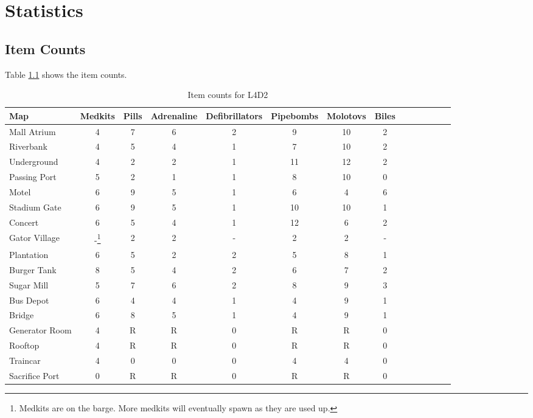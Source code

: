 \appendix
\chapter{Statistics}
\section{Item Counts}
Table \ref{tab:item_counts2} shows the item counts.

\begin{savenotes}
\begin{table}[htb!]
\centering
\caption{Item counts for L4D2}
\label{tab:item_counts2}
\resizebox{\columnwidth}{!} {
\begin{tabular}{|l|c|c|c|c|c|c|c|c|c|c|c|c|c|}
\hline
Map & Medkits & Pills & Adrenaline & Defibrillators & Pipebombs & Molotovs & Biles \\ \hline
Mall Atrium & 4 & 7 & 6&  2 & 9 & 10 & 2 \\ \hline
Riverbank & 4 & 5 & 4&  1 & 7 & 10 & 2 \\ \hline
Underground & 4 & 2 & 2&  1 & 11 & 12 & 2 \\ \hline
Passing Port & 5 & 2 & 1&  1 & 8 & 10 & 0 \\ \hline
Motel & 6 & 9 & 5&  1 & 6 & 4 & 6 \\ \hline
Stadium Gate & 6 & 9 & 5&  1 & 10 & 10 & 1 \\ \hline
Concert & 6 & 5 & 4&  1 & 12 & 6 & 2 \\ \hline
Gator Village & -\footnote{Medkits are on the barge. More medkits will eventually spawn as they are used up.} & 2 & 2&  - & 2 & 2 & - \\ \hline
Plantation & 6 & 5 & 2&  2 & 5 & 8 & 1 \\ \hline
Burger Tank & 8 & 5 & 4&  2 & 6 & 7 & 2 \\ \hline
Sugar Mill & 5 & 7 & 6&  2 & 8 & 9 & 3 \\ \hline
Bus Depot & 6 & 4 & 4&  1 & 4 & 9 & 1 \\ \hline
Bridge & 6 & 8 & 5&  1 & 4 & 9 & 1 \\ \hline
Generator Room & 4 & R & R&  0 & R & R & 0 \\ \hline
Rooftop & 4 & R & R&  0 & R & R & 0 \\ \hline
Traincar & 4 & 0 & 0&  0 & 4 & 4 & 0 \\ \hline
Sacrifice Port & 0 & R & R&  0 & R & R & 0 \\ \hline
\end{tabular}
}
\end{table}
\end{savenotes}

